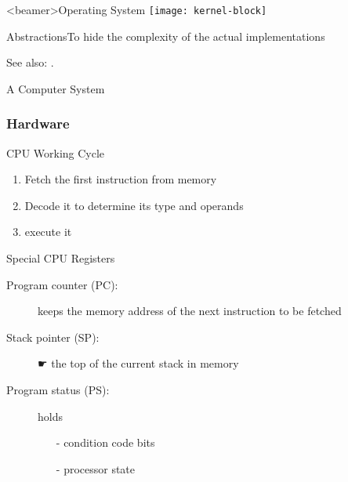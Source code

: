\begin{frame}<beamer>{Operating System}
  \centering
  \texttt{[image: kernel-block]}
\end{frame}

\begin{frame}{Abstractions}{To hide the complexity of the actual implementations}
  \begin{center}
  \end{center}
\end{frame}

See also: .

\begin{frame}{A Computer System}
  \begin{center}
  \end{center}
\end{frame}

\subsubsection{Hardware}
\label{sec:cpu}

\begin{frame}{CPU Working Cycle}
  \begin{center}
  \end{center}
  \begin{enumerate}
  \item Fetch the first instruction from memory
  \item Decode it to determine its type and operands
  \item execute it
  \end{enumerate}
  \begin{block}{Special CPU Registers}
    \begin{description}
    \item[Program counter (PC):] keeps the memory address of the next instruction to
      be fetched
    \item[Stack pointer (SP):] {\symbola ☛} the top of the current stack in memory
    \item[Program status (PS):] holds
      \begin{itemize}
      \item[-] condition code bits
      \item[-] processor state
      \end{itemize}
    \end{description}
  \end{block}
\end{frame}

